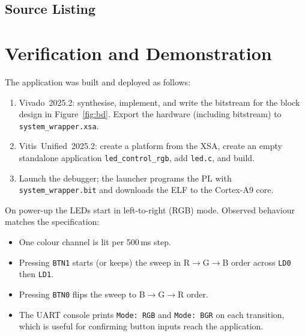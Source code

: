 \documentclass[12pt]{article}
\begin{document}
\subsection{Source Listing}



\section{Verification and Demonstration}
\label{sec:verify}

The application was built and deployed as follows:

\begin{enumerate}[nosep]
  \item Vivado~2025.2: synthesise, implement, and write the bitstream
        for the block design in Figure~\ref{fig:bd}. Export the
        hardware (including bitstream) to
        \texttt{system\_wrapper.xsa}.
  \item Vitis~Unified~2025.2: create a platform from the XSA, create
        an empty standalone application \texttt{led\_control\_rgb},
        add \texttt{led.c}, and build.
  \item Launch the debugger; the launcher programs the PL with
        \texttt{system\_wrapper.bit} and downloads the ELF to the
        Cortex-A9 core.
\end{enumerate}

\noindent
On power-up the LEDs start in left-to-right (RGB) mode. Observed
behaviour matches the specification:

\begin{itemize}[nosep]
  \item One colour channel is lit per 500\,ms step.
  \item Pressing \texttt{BTN1} starts (or keeps) the sweep in R$\rightarrow$G$\rightarrow$B order
        across \texttt{LD0} then \texttt{LD1}.
  \item Pressing \texttt{BTN0} flips the sweep to B$\rightarrow$G$\rightarrow$R order.
  \item The UART console prints \texttt{Mode:\ RGB} and
        \texttt{Mode:\ BGR} on each transition, which is useful for
        confirming button inputs reach the application.
\end{itemize}
\end{document}
